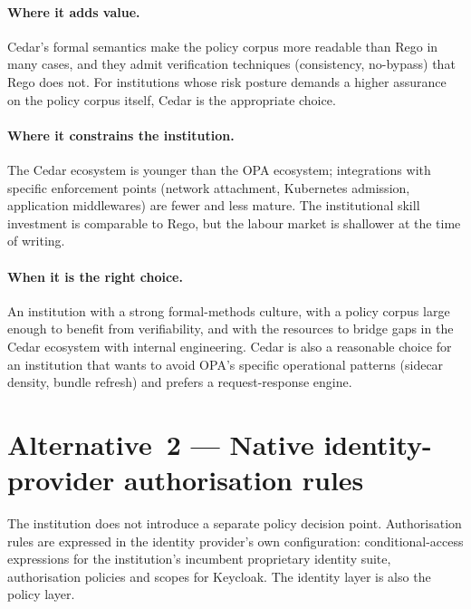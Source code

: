 \paragraph{Where it adds value.} Cedar's formal semantics make the
policy corpus more readable than Rego in many cases, and they admit
verification techniques (consistency, no-bypass) that Rego does not.
For institutions whose risk posture demands a higher assurance on the
policy corpus itself, Cedar is the appropriate choice.

\paragraph{Where it constrains the institution.} The Cedar
ecosystem is younger than the OPA ecosystem; integrations with
specific enforcement points (network attachment, Kubernetes
admission, application middlewares) are fewer and less mature. The
institutional skill investment is comparable to Rego, but the labour
market is shallower at the time of writing.

\paragraph{When it is the right choice.} An institution with a
strong formal-methods culture, with a policy corpus large enough to
benefit from verifiability, and with the resources to bridge gaps in
the Cedar ecosystem with internal engineering. Cedar is also a
reasonable choice for an institution that wants to avoid OPA's
specific operational patterns (sidecar density, bundle refresh) and
prefers a request-response engine.

\section{Alternative~2 --- Native identity-provider authorisation rules}
\label{sec:po-alt2}

\begin{alternativebox}
\noindent The institution does not introduce a separate policy
decision point. Authorisation rules are expressed in the identity
provider's own configuration: conditional-access expressions for
the institution's incumbent proprietary identity suite, authorisation
policies and scopes for Keycloak.
The identity layer is also the policy layer.
\end{alternativebox}

